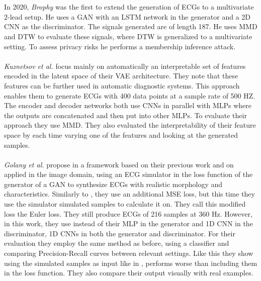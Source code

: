 \\ \\
In 2020, \textit{Brophy} \cite{brophySynthesisDependentMultichannel2020} was the first to extend the generation of ECGs to a multivariate 2-lead setup. He uses a GAN with an LSTM network in the generator and a 2D CNN as the discriminator. The signals generated are of length 187. He uses MMD and DTW to evaluate these signals, where DTW is generalized to a multivariate setting. To assess privacy risks he performs a membership inference attack.
\\ \\
\textit{Kuznetsov et al.} \cite{kuznetsovElectrocardiogramGenerationFeature2020} focus mainly on automatically an interpretable set of features encoded in the latent space of their VAE architecture. They note that these features can be further used in automatic diagnostic systems. This approach enables them to generate ECGs with 400 data points at a sample rate of 500 HZ. The encoder and decoder networks both use CNNs in parallel with MLPs where the outputs are concatenated and then put into other MLPs. To evaluate their approach they use MMD. They also evaluated the interpretability of their feature space by each time varying one of the features and looking at the generated samples.
\\ \\
\textit{Golany et al.} propose in \cite{golanySimGANsSimulatorBasedGenerative2020} a framework based on their previous work \cite{golanyPGANsPersonalizedGenerative2019} and on \cite{shrivastavaLearningSimulatedUnsupervised2017} applied in the image domain, using an ECG simulator in the loss function of the generator of a GAN to synthesize ECGs with realistic morphology and characteristics. Similarly to \cite{golanyPGANsPersonalizedGenerative2019}, they use an additional MSE loss, but this time they use the simulator simulated samples to calculate it on. They call this modified loss the Euler loss. They still produce ECGs of 216 samples at 360 Hz. However, in this work, they use instead of their MLP in the generator and 1D CNN in the discriminator, 1D CNNs in both the generator and discriminator. For their evaluation they employ the same method as before, using a classifier and comparing Precision-Recall curves between relevant settings. Like this they show using the simulated samples as input like in \cite{shrivastavaLearningSimulatedUnsupervised2017}, performs worse than including them in the loss function. They also compare their output visually with real examples.
\\ \\

